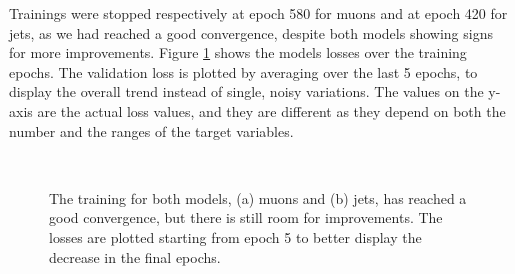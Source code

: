 Trainings were stopped respectively at epoch 580 for muons and at epoch 420 for jets, as we had reached a good convergence, despite both models showing signs for more improvements. Figure \ref{fig:losses} shows the models losses over the training epochs. The validation loss is plotted by averaging over the last 5 epochs, to display the overall trend instead of single, noisy variations. The values on the y-axis are the actual loss values, and they are different as they depend on both the number and the ranges of the target variables.


\begin{figure}
    \myfloatalign
     \\
    \caption[Models losses]{The training for both models, (a) muons and (b) jets, has reached a good convergence, but there is still room for improvements. The losses are plotted starting from epoch 5 to better display the decrease in the final epochs.}\label{fig:losses}
    
\end{figure}

